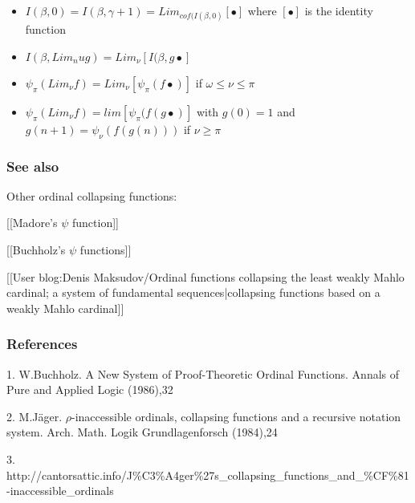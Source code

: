 \documentclass[10pt]{article}
\begin{document}
\begin{itemize}
\bigskip

\item \( I(\beta,0) = I(\beta,\gamma+1) = Lim_{cof(I(\beta,0)} [\bullet] \) where \( [\bullet] \) is the identity function
\item \( I(\beta,Lim_nu g) = Lim_\nu [I(\beta,g \bullet] \)
\item \( \psi_\pi(Lim_\nu f) = Lim_\nu [\psi_\pi(f \bullet)] \) if \( \omega \le \nu \le \pi \)
\item \( \psi_\pi(Lim_\nu f) = lim [\psi_\pi(f (g \bullet)] \) with \( g(0) = 1 \) and \( g (n+1) = \psi_\nu(f(g(n))) \) if \( \nu \ge \pi \)

\end{itemize}

\subsubsection{See also}

Other ordinal collapsing functions:

[[Madore's \(\psi\) function]]

[[Buchholz's \(\psi\) functions]]

[[User blog:Denis Maksudov/Ordinal functions collapsing the least weakly Mahlo cardinal; a system of fundamental sequences|collapsing functions based on a weakly Mahlo cardinal]]


\subsubsection{References}

1. W.Buchholz. A New System of Proof-Theoretic Ordinal Functions. Annals of Pure and Applied Logic (1986),32

2. M.Jäger. \(\rho\)-inaccessible ordinals, collapsing functions and a recursive notation system. Arch. Math. Logik Grundlagenforsch (1984),24

3. http://cantorsattic.info/J\%C3\%A4ger\%27s\_collapsing\_functions\_and\_\%CF\%81-inaccessible\_ordinals
\end{document}
